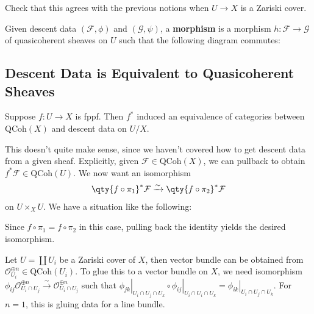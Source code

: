 \begin{exercise}[?]

Check that this agrees with the previous notions when \(U\to X\) is a
Zariski cover.

\end{exercise}

\begin{definition}

Given descent data \((\mathcal{F}, \phi)\) and \((\mathcal{G}, \psi)\),
a \textbf{morphism} is a morphism \(h: \mathcal{F} \to \mathcal{G}\) of
quasicoherent sheaves on \(U\) such that the following diagram commutes:

\end{definition}

\hypertarget{descent-data-is-equivalent-to-quasicoherent-sheaves}{%
\subsection{Descent Data is Equivalent to Quasicoherent
Sheaves}\label{descent-data-is-equivalent-to-quasicoherent-sheaves}}

\begin{theorem}

Suppose \(f: U\to X\) is fppf. Then \(f^*\) induced an equivalence of
categories between \({\mathrm{QCoh}}(X)\) and descent data on \(U/X\).

\end{theorem}

\begin{remark}

This doesn't quite make sense, since we haven't covered how to get
descent data from a given sheaf. Explicitly, given
\(\mathcal{F}\in {\mathrm{QCoh}}(X)\), we can pullback to obtain
\(f^* \mathcal{F}\in {\mathrm{QCoh}}(U)\). We now want an isomorphism
\begin{align*}  
\qty{f\circ \pi_1}^* \mathcal{F} \xrightarrow{\sim} \qty{f\circ \pi_2}^* \mathcal{F}
\end{align*}
on \(U\times_X U\). We have a situation like the following:

Since \(f\circ \pi_1 = f\circ \pi_2\) in this case, pulling back the
identity yields the desired isomorphism.

\end{remark}

\begin{example}[?]

Let \(U = {\coprod}U_i\) be a Zariski cover of \(X\), then vector bundle
can be obtained from
\({\mathcal{O}}_{U_i}^{\oplus n}\in {\mathrm{QCoh}}(U_i)\). To glue this
to a vector bundle on \(X\), we need isomorphism
\(\phi_{ij} {\mathcal{O}}_{U_i\cap U_j}^{\oplus n} \xrightarrow{\sim } {\mathcal{O}}_{U_i\cap U_j}^{\oplus n}\)
such that
\({ \left.{{\phi_{jk}}} \right|_{{U_i \cap U_j \cap U_k}} } \circ { \left.{{\phi_{ij}}} \right|_{{U_i \cap U_i \cap U_k}} } = { \left.{{\phi_{ik}}} \right|_{{U_i\cap U_j \cap U_k}} }\).
For \(n=1\), this is gluing data for a line bundle.

\end{example}

